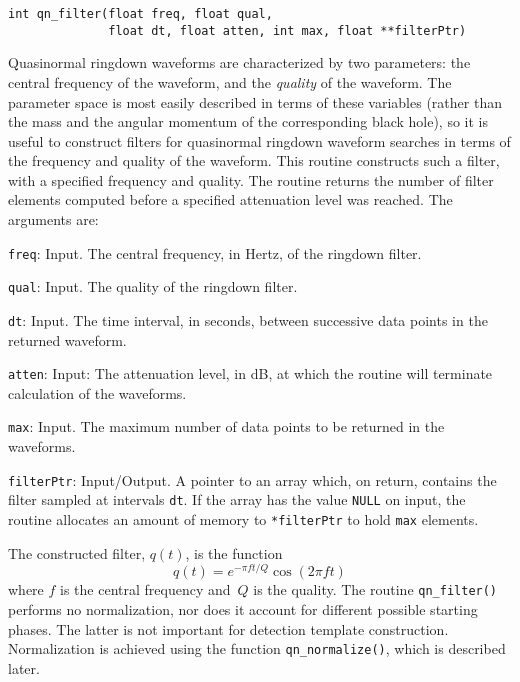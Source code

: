 \begin{verbatim}
int qn_filter(float freq, float qual,
              float dt, float atten, int max, float **filterPtr)
\end{verbatim}
Quasinormal ringdown waveforms are characterized by two parameters:
the central frequency of the waveform, and the \emph{quality} of the
waveform.  The parameter space is most easily described in terms of
these variables (rather than the mass and the angular momentum of the
corresponding black hole), so it is useful to construct filters for
quasinormal ringdown waveform searches in terms of the frequency and
quality of the waveform.  This routine constructs such a filter, with
a specified frequency and quality.  The routine returns
the number of filter elements computed before a specified attenuation
level was reached.  The arguments are:
\begin{description}
\item{\texttt{freq}}: Input.  The central frequency, in Hertz, of the
  ringdown filter.
\item{\texttt{qual}}: Input.  The quality of the ringdown filter.
\item{\texttt{dt}}: Input. The time interval, in seconds, between successive
  data points in the returned waveform.
\item{\texttt{atten}}: Input:  The attenuation level, in dB, at which the
  routine will terminate calculation of the waveforms.
\item{\texttt{max}}: Input.  The maximum number of data points to be returned
  in the waveforms.
\item{\texttt{filterPtr}}: Input/Output.  A pointer to an array which, on
  return, contains the filter sampled at intervals
  \texttt{dt}.  If the array has the value \texttt{NULL} on input, the routine
  allocates an amount of memory to \texttt{*filterPtr} to hold \texttt{max}
  elements.
\end{description}

The constructed filter, $q(t)$, is the function
\begin{equation}
  q(t) = e^{-\pi ft/Q}\cos(2\pi ft)
\end{equation}
where $f$ is the central frequency and~$Q$ is the quality.  The routine
\texttt{qn\_filter()} performs no normalization, nor does it account for
different possible starting phases.  The latter is not important for
detection template construction.  Normalization is achieved using the
function \texttt{qn\_normalize()}, which is described later.


